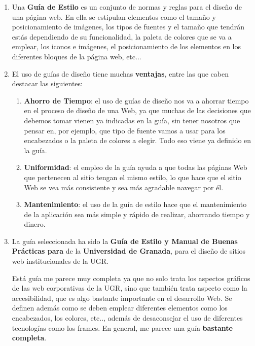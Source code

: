 \begin{enumerate}[label=\alph*)]
    \item Una \textbf{Guía de Estilo} es un conjunto de normas y reglas para el diseño de una página web. En ella se estipulan elementos como el tamaño y posicionamiento de imágenes, los tipos de fuentes y el tamaño que tendrán estás dependiendo de su funcionalidad, la paleta de colores que se va a emplear, los iconos e imágenes, el posicionamiento de los elementos en los diferentes bloques de la página web, etc...

    \item El uso de guías de diseño tiene muchas \textbf{ventajas}, entre las que caben destacar las siguientes:
    \begin{enumerate}
        \item \textbf{Ahorro de Tiempo}: el uso de guías de diseño nos va a ahorrar tiempo en el proceso de diseño de una Web, ya que muchas de las decisiones que debemos tomar vienen ya indicadas en la guía, sin tener nosotros que pensar en, por ejemplo, que tipo de fuente vamos a usar para los encabezados o la paleta de colores a elegir. Todo eso viene ya definido en la guía.

        \item \textbf{Uniformidad}: el empleo de la guía ayuda a que todas las páginas Web que pertenecen al sitio tengan el mismo estilo, lo que hace que el sitio Web se vea más consistente y sea más agradable navegar por él.

        \item \textbf{Mantenimiento}: el uso de la guía de estilo hace que el mantenimiento de la aplicación sea más simple y rápido de realizar, ahorrando tiempo y dinero.
    \end{enumerate}

    \item La guía seleccionada ha sido la \textbf{Guía de Estilo y Manual de Buenas Prácticas para} de la \textbf{Universidad de Granada}, para el diseño de sitios web institucionales de la UGR.

    Está guía me parece muy completa ya que no solo trata los aspectos gráficos de las web corporativas de la UGR, sino que también trata aspecto como la accesibilidad, que es algo bastante importante en el desarrollo Web. Se definen además como se deben emplear diferentes elementos como los encabezados, los colores, etc.., además de desaconsejar el uso de diferentes tecnologías como los frames. En general, me parece una guía \textbf{bastante completa}.


\end{enumerate}
